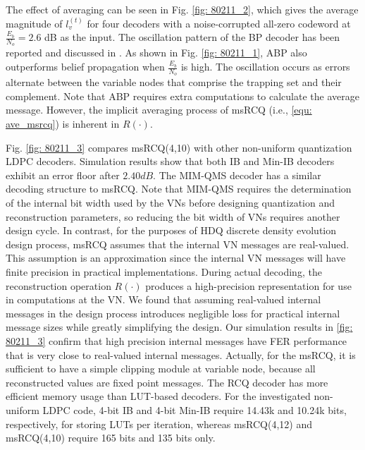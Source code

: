\documentclass [PhD] {uclathes}
\begin{document}
The effect of averaging can be seen in Fig. \ref{fig: 80211_2}, which gives the average magnitude of $l^{(t)}_v$ for four decoders with a noise-corrupted all-zero codeword at $\frac{E_b}{N_o}=2.6$ dB as the input. The oscillation pattern of the BP decoder has been reported and discussed in \cite{ABP}.  As shown in Fig. \ref{fig: 80211_1}, ABP also outperforms belief propagation when $\frac{E_b}{N_o}$ is high. 
The oscillation occurs as errors alternate between the variable nodes that comprise the trapping set and their complement.
Note that ABP requires extra computations to calculate the average message. However, the implicit averaging process of msRCQ (i.e., \eqref{equ: ave_msrcq}) is inherent in $R(\cdot)$. 

Fig. \ref{fig: 80211_3} compares msRCQ(4,10) with other non-uniform quantization LDPC decoders. Simulation results show that both IB\cite{Lewandowsky2018-IBRegular} and Min-IB\cite{Meidlinger2017-MINIBIRR} decoders exhibit an error floor after $2.40dB$. The MIM-QMS\cite{kang2020generalized} decoder has a similar decoding structure to msRCQ. Note that MIM-QMS requires the determination of the internal bit width used by the VNs before designing quantization and reconstruction parameters, so reducing the bit width of VNs requires another design cycle. 
In contrast, for the purposes of HDQ discrete density evolution design process, msRCQ assumes that the internal VN  messages are real-valued. This assumption is an approximation since the internal VN messages will have finite precision in practical implementations. During actual decoding, the reconstruction operation $R(\cdot)$ produces a high-precision representation for use in computations at the VN. We found that assuming real-valued internal messages in the design process introduces negligible loss for practical internal message sizes while greatly simplifying the design. Our simulation results in \ref{fig: 80211_3} confirm that high precision internal messages have FER performance that is very close to real-valued internal messages.
Actually, for the msRCQ, it is sufficient to have a simple clipping module at variable node, because all reconstructed values are fixed point messages. 
The RCQ decoder has more efficient memory usage than LUT-based decoders. For the investigated non-uniform LDPC code, 4-bit IB and 4-bit Min-IB require 14.43k and 10.24k bits, respectively, for storing LUTs per iteration, whereas msRCQ(4,12) and msRCQ(4,10) require 165 bits and 135 bits only.   
\end{document}

